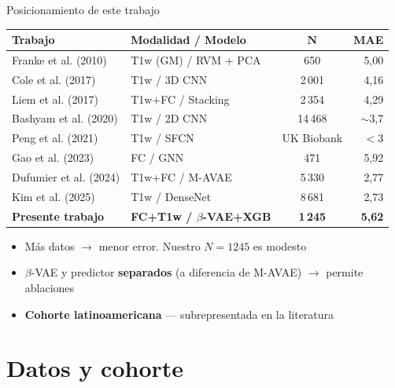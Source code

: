 \documentclass[aspectratio=169, 11pt]{beamer}
\newcommand{\highlight}[1]{\textcolor{uncaccent}{\textbf{#1}}}
\begin{document}
\begin{frame}{Posicionamiento de este trabajo}
  \centering
  {\footnotesize
  \begin{tabular}{llcr}
    \toprule
    \textbf{Trabajo} & \textbf{Modalidad / Modelo} & $\boldsymbol{N}$ & \textbf{MAE} \\
    \midrule
    Franke et al. (2010) & T1w (GM) / RVM + PCA & 650 & 5,00 \\
    Cole et al. (2017) & T1w / 3D CNN & 2\,001 & 4,16 \\
    Liem et al. (2017) & T1w+FC / Stacking & 2\,354 & 4,29 \\
    Bashyam et al. (2020) & T1w / 2D CNN & 14\,468 & $\sim$3,7 \\
    Peng et al. (2021) & T1w / SFCN & UK Biobank & $<$3 \\
    Gao et al. (2023) & FC / GNN & 471 & 5,92 \\
    Dufumier et al. (2024) & T1w+FC / M-AVAE & 5\,330 & 2,77 \\
    Kim et al. (2025) & T1w / DenseNet & 8\,681 & 2,73 \\
    \midrule
    \rowcolor{unclight}
    \textbf{Presente trabajo} & \textbf{FC+T1w / $\beta$-VAE+XGB} & \textbf{1\,245} & \textbf{5,62} \\
    \bottomrule
  \end{tabular}}

  \vspace{0.3cm}
  \begin{itemize}
    \item Más datos $\rightarrow$ menor error. Nuestro $N = 1245$ es modesto
    \item $\beta$-VAE y predictor \textbf{separados} (a diferencia de M-AVAE) $\rightarrow$ permite ablaciones
    \item \highlight{Cohorte latinoamericana} — subrepresentada en la literatura
  \end{itemize}
\end{frame}


\section{Datos y cohorte}
\end{document}
